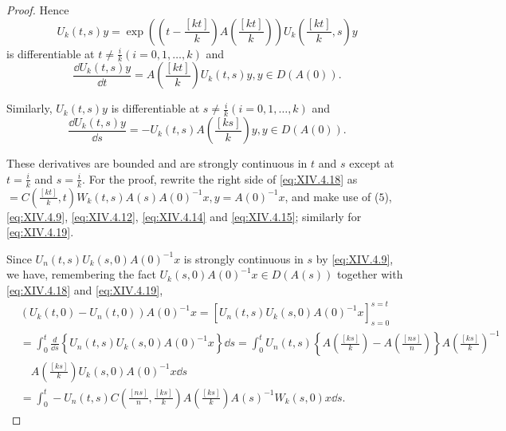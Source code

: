 \begin{proof}
Hence 
\[
U _{k} (t, s) y = \exp \left(\left(t - \frac {[ k t ]}{k}\right) A \left(\frac {[ k t ]}{k}\right)\right) U _{k} \left(\frac {[ k t ]}{k}, s\right) y
\]
is differentiable at $t \neq \frac{i}{k} (i = 0, 1, \ldots, k)$ and 
\begin{equation}\label{eq:XIV.4.18}
\frac {\dd U _{k} (t , s) y}{\dd t} = A \left(\frac {[ k t ]}{k}\right) U _{k} (t, s) y, y \in D (A (0)).
\end{equation}

Similarly, $U_{k}(t,s)y$ is differentiable at $s\neq \frac{i}{k} (i = 0,1,\dots ,k)$ and 
\begin{equation}\label{eq:XIV.4.19}
\frac {\dd U _{k} (t , s) y}{\dd s} = - U _{k} (t, s) A \left(\frac {[ k s ]}{k}\right) y, y \in D (A (0)).
\end{equation}

These derivatives are bounded and are strongly continuous in $t$ and $s$ except at $t = \frac{i}{k}$ and $s = \frac{i}{k}$. For the proof, rewrite the right side of \eqref{eq:XIV.4.18} as $= C\left(\frac{[kt]}{k}, t\right) W_k(t, s) A(s) A(0)^{-1}x, y = A(0)^{-1}x$, and make use of ($5$), \eqref{eq:XIV.4.9}, \eqref{eq:XIV.4.12}, \eqref{eq:XIV.4.14} and \eqref{eq:XIV.4.15}; similarly for \eqref{eq:XIV.4.19}. 

Since $U_{n}(t,s)U_{k}(s,0)A(0)^{-1}x$ is strongly continuous in $s$ by \eqref{eq:XIV.4.9}, we have, remembering the fact $U_{k}(s,0)A(0)^{-1}x\in D(A(s))$ together with \eqref{eq:XIV.4.18} and \eqref{eq:XIV.4.19}, 
\[
\begin{aligned}
&\left(U _{k} (t, 0) - U _{n} (t, 0)\right) A (0) ^{-1} x = [ U _{n} (t, s) U _{k} (s, 0) A (0) ^{-1} x ] _{s=0} ^{s=t}
\\
&= \int_{0} ^{t} \frac {d}{\dd s} \left\{U _{n} (t, s) U _{k} (s, 0) A (0) ^{-1} x \right\} \dd s = \int_{0} ^{t} U _{n} (t, s) \left\{A \left(\frac {[ k s ]}{k}\right) - A \left(\frac {[ n s ]}{n}\right) \right\} A \left(\frac {[ k s ]}{k}\right) ^{-1}
\\
&\quad A \left(\frac {[ k s ]}{k}\right) U _{k} (s, 0) A (0) ^{-1} x \dd s
\\
&= \int_{0} ^{t} - U _{n} (t, s) C \left(\frac {[ n s ]}{n}, \frac {[ k s ]}{k}\right) A \left(\frac {[ k s ]}{k}\right) A (s) ^{-1} W _{k} (s, 0) x \dd s.
\end{aligned}
\]


\end{proof}

